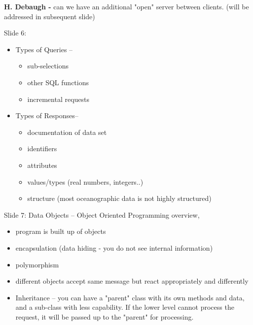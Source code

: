 \begin{description}
\smallskip
{\bf H. Debaugh -} can we have an additional "open" server between clients.  
(will be addressed in subsequent slide)
\clearpage
\item{Slide 6:}
	   \begin{itemize}
		\item Types of Queries --
	  	   \begin{itemize}
			\item sub-selections
			\item other SQL functions
			\item incremental requests
	  	   \end{itemize}

		\item Types of Responses--
	  	   \begin{itemize}
			\item documentation of data set
			\item identifiers
			\item attributes
			\item values/types (real numbers, integers..)
			\item structure (most oceanographic data is not highly
structured) 
   	   	   \end{itemize}

\begin{figure}[h]
\centerline{}
\end{figure}
\clearpage
	   \end{itemize}
\item{Slide 7:} Data Objects -- Object Oriented Programming overview,
	\begin{itemize}
		\item program is built up of objects
		\item encapsulation (data hiding - you do not see internal
information) 
		\item polymorphism
		\item different objects accept same message but react
appropriately and differently

		\item Inheritance -- you can have a "parent" class with its
own methods and data, and a sub-class with less capability.  If the lower
level cannot process the request, it will be passed up to the "parent" for
processing.  
	\end{itemize}

\begin{figure}[h]
\centerline{}
\end{figure}
\clearpage


\end{description}
